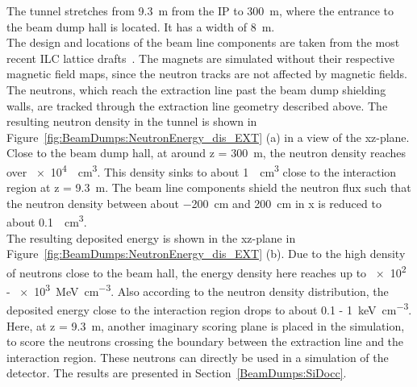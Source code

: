 \FloatBarrier
The tunnel stretches from \SI{9.3}{\meter} from the IP to \SI{300}{\meter}, where the entrance to the beam dump hall is located.
It has a width of \SI{8}{\meter}.
\\The design and locations of the beam line components are taken from the most recent ILC lattice drafts~\cite{EXT_lattice,EXT_lattice2}.
The magnets are simulated without their respective magnetic field maps, since the neutron tracks are not affected by magnetic fields.
The neutrons, which reach the extraction line past the beam dump shielding walls, are tracked through the extraction line geometry described above.
The resulting neutron density in the tunnel is shown in Figure~\ref{fig:BeamDumps:NeutronEnergy_dis_EXT} (a) in a view of the xz-plane.
Close to the beam dump hall, at around z = \SI{300}{\meter}, the neutron density reaches over \SI{e4}{\per\centi\meter\cubed}.
This density sinks to about \SI{1}{\per\centi\meter\cubed} close to the interaction region at z = \SI{9.3}{\meter}.
The beam line components shield the neutron flux such that the neutron density between about \SI{-200}{\centi\meter} and \SI{200}{\centi\meter} in x is reduced to about \SI{0.1}{\per\centi\meter\cubed}.
\\The resulting deposited energy is shown in the xz-plane in Figure~\ref{fig:BeamDumps:NeutronEnergy_dis_EXT} (b).
Due to the high density of neutrons close to the beam hall, the energy density here reaches up to 
\num{e2} - \SI{e3}{\MeV\per\centi\meter\cubed}.
Also according to the neutron density distribution, the deposited energy close to the interaction region drops to about \num{0.1} - \SI{1}{\keV\per\centi\meter\cubed}.
\\Here, at z = \SI{9.3}{\meter}, another imaginary scoring plane is placed in the \fluka simulation, to score the neutrons crossing the boundary between the extraction line and the interaction region.
These neutrons can directly be used in a \geant simulation of the \sid detector.
The results are presented in Section~\ref{BeamDumps:SiDocc}.

